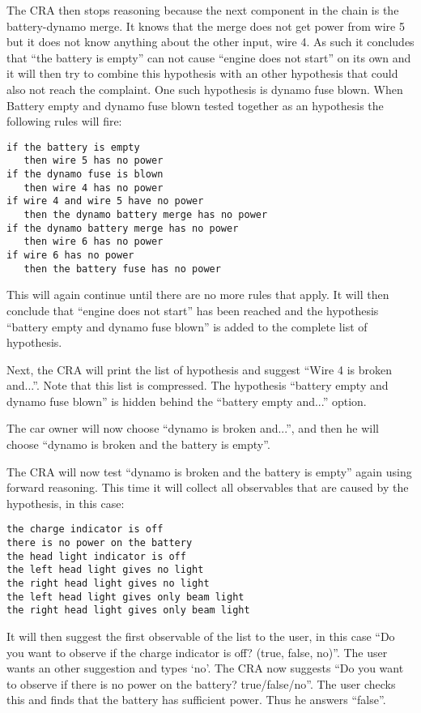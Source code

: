 The CRA then stops reasoning because the next component in the chain is the battery-dynamo merge. It knows that the merge does not get power from wire 5 but it does not know anything about the other input, wire 4. As such it concludes that ``the battery is empty'' can not cause ``engine does not start'' on its own and it will then try to combine this hypothesis with an other hypothesis that could also not reach the complaint. One such hypothesis is dynamo fuse blown. When Battery empty and dynamo fuse blown tested together as an hypothesis the following rules will fire:

\begin{verbatim}
if the battery is empty 
   then wire 5 has no power
if the dynamo fuse is blown 
   then wire 4 has no power
if wire 4 and wire 5 have no power 
   then the dynamo battery merge has no power
if the dynamo battery merge has no power 
   then wire 6 has no power
if wire 6 has no power 
   then the battery fuse has no power
\end{verbatim}

This will again continue until there are no more rules that apply. It will then conclude that ``engine does not start'' has been reached and the hypothesis ``battery empty and dynamo fuse blown'' is added to the complete list of hypothesis.

Next, the CRA will print the list of hypothesis and suggest ``Wire 4 is broken and...''. Note that this list is compressed. The hypothesis ``battery empty and dynamo fuse blown'' is hidden behind the ``battery empty and...'' option.

The car owner will now choose ``dynamo is broken and...'', and then he will choose ``dynamo is broken and the battery is empty''.

The CRA will now test ``dynamo is broken and the battery is empty'' again using forward reasoning. This time it will collect all observables that are caused by the hypothesis, in this case:

\begin{verbatim}
the charge indicator is off
there is no power on the battery
the head light indicator is off
the left head light gives no light
the right head light gives no light
the left head light gives only beam light
the right head light gives only beam light
\end{verbatim}

It will then suggest the first observable of the list to the user, in this case ``Do you want to observe if the charge indicator is off? (true, false, no)''. The user wants an other suggestion and types `no'. The CRA now suggests ``Do you want to observe if there is no power on the battery? true/false/no''. The user checks this and finds that the battery has sufficient power. Thus he answers ``false''.

